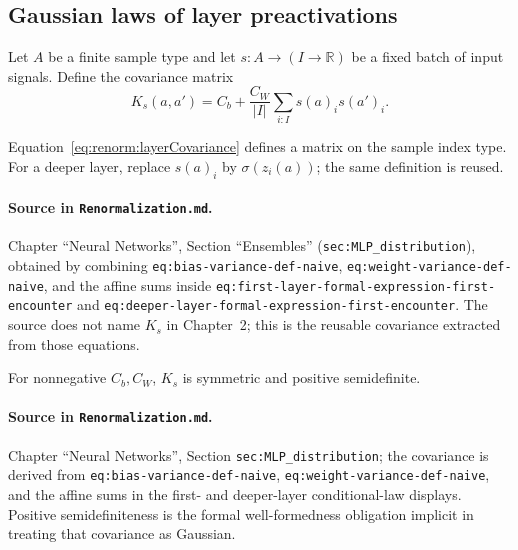 \subsection{Gaussian laws of layer preactivations}

Let $A$ be a finite sample type and let $s:A\to(I\to\mathbb R)$ be a fixed batch of input signals.
Define the covariance matrix
\begin{equation}
  K_s(a,a')=C_b+\frac{C_W}{|I|}\sum_{i:I}s(a)_i s(a')_i.
  \label{eq:renorm:layerCovariance}
\end{equation}

\begin{definition}
\label{def:renorm:layerCovariance}
Equation~\eqref{eq:renorm:layerCovariance} defines a matrix on the sample index type.  For a deeper
layer, replace $s(a)_i$ by $\sigma(z_i(a))$; the same definition is reused.

\paragraph{Source in \texttt{Renormalization.md}.}
Chapter ``Neural Networks'', Section ``Ensembles'' (\texttt{sec:MLP\_distribution}), obtained by
combining \texttt{eq:bias-variance-def-naive}, \texttt{eq:weight-variance-def-naive}, and the affine
sums inside \texttt{eq:first-layer-formal-expression-first-encounter} and
\texttt{eq:deeper-layer-formal-expression-first-encounter}.  The source does not name $K_s$ in
Chapter~2; this is the reusable covariance extracted from those equations.
\end{definition}

\begin{lemma}
\label{lem:renorm:layerCovariancePSD}
For nonnegative $C_b,C_W$, $K_s$ is symmetric and positive semidefinite.

\paragraph{Source in \texttt{Renormalization.md}.}
Chapter ``Neural Networks'', Section \texttt{sec:MLP\_distribution}; the covariance is derived from
\texttt{eq:bias-variance-def-naive}, \texttt{eq:weight-variance-def-naive}, and the affine sums in
the first- and deeper-layer conditional-law displays.  Positive semidefiniteness is the formal
well-formedness obligation implicit in treating that covariance as Gaussian.
\end{lemma}


